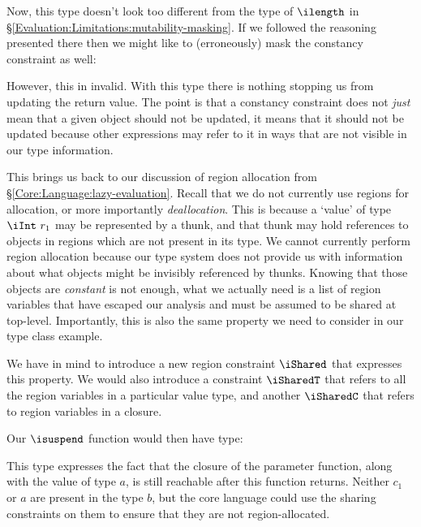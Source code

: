 Now, this type doesn't look too different from the type of $\ilength$ in \S\ref{Evaluation:Limitations:mutability-masking}. If we followed the reasoning presented there then we might like to (erroneously) mask the constancy constraint as well:


However, this in invalid. With this type there is nothing stopping us from updating the return value. The point is that a constancy constraint does not \emph{just} mean that a given object should not be updated, it means that it should not be updated because other expressions may refer to it in ways that are not visible in our type information.

This brings us back to our discussion of region allocation from \S\ref{Core:Language:lazy-evaluation}. Recall that we do not currently use regions for allocation, or more importantly \emph{deallocation}. This is because a `value' of type $\iInt \ r_1$ may be represented by a thunk, and that thunk may hold references to objects in regions which are not present in its type. We cannot currently perform region allocation because our type system does not provide us with information about what objects might be invisibly referenced by thunks. Knowing that those objects are \emph{constant} is not enough, what we actually need is a list of region variables that have escaped our analysis and must be assumed to be shared at top-level. Importantly, this is also the same property we need to consider in our type class example.

We have in mind to introduce a new region constraint $\iShared$ that expresses this property. We would also introduce a constraint $\iSharedT$ that refers to all the region variables in a particular value type, and another $\iSharedC$ that refers to region variables in a closure.

Our $\isuspend$ function would then have type:


This type expresses the fact that the closure of the parameter function, along with the value of type $a$, is still reachable after this function returns. Neither $c_1$ or $a$ are present in the type $b$, but the core language could use the sharing constraints on them to ensure that they are not region-allocated.

